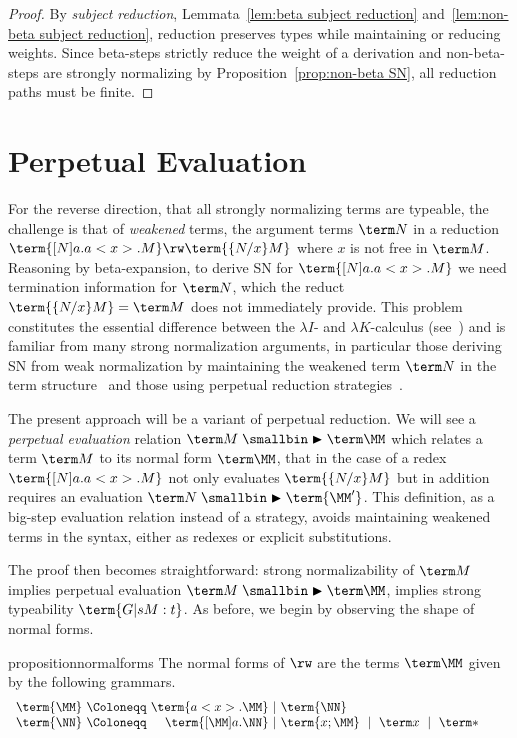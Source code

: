 \documentclass[10pt,a4paper]{amsart}
\newcommand\rp{\mathrel{\smallbin\blacktriangleright}}
\begin{document}
\begin{proof}
By \emph{subject reduction}, Lemmata~\ref{lem:beta subject reduction} and~\ref{lem:non-beta subject reduction}, reduction preserves types while maintaining or reducing weights. Since beta-steps strictly reduce the weight of a derivation and non-beta-steps are strongly normalizing by Proposition~\ref{prop:non-beta SN}, all reduction paths must be finite.
\end{proof}


\section{Perpetual Evaluation}
\label{sec:perp}

For the reverse direction, that all strongly normalizing terms are typeable, the challenge is that of \emph{weakened} terms, the argument terms $\term N$ in a reduction $\term{[N]a.a<x>.M}\rw\term{\{N/x\}M}$ where $x$ is not free in $\term M$. Reasoning by beta-expansion, to derive SN for $\term{[N]a.a<x>.M}$ we need termination information for $\term N$, which the reduct $\term{\{N/x\}M}=\term M$ does not immediately provide. This problem constitutes the essential difference between the $\lambda I$- and $\lambda K$-calculus (see~\cite{Barendregt-1984}) and is familiar from many strong normalization arguments, in particular those deriving SN from weak normalization by maintaining the weakened term $\term N$ in the term structure~\cite{Klop-1980,Nederpelt-1973} and those using perpetual reduction strategies~\cite{Bergstra-Klop-1982,Raamsdonk-Severi-Sorensen-Xi-1999}.

The present approach will be a variant of perpetual reduction. We will see a \emph{perpetual evaluation} relation $\term M\rp\term\MM$ which relates a term $\term M$ to its normal form $\term\MM$, that in the case of a redex $\term{[N]a.a<x>.M}$ not only evaluates $\term{\{N/x\}M}$ but in addition requires an evaluation $\term N\rp\term{\MM'}$. This definition, as a big-step evaluation relation instead of a strategy, avoids maintaining weakened terms in the syntax, either as redexes or explicit substitutions.

The proof then becomes straightforward: strong normalizability of $\term M$ implies perpetual evaluation $\term M\rp\term\MM$, implies strong typeability $\term{G |s M:t}$. As before, we begin by observing the shape of normal forms.

\begin{restatable}{proposition}{normalforms}
The normal forms of $\rw$ are the terms $\term\MM$ given by the following grammars.
\[
\begin{array}{l@{~}l@{~}r@{~}l@{~}l}
	\term{\MM} &\Coloneqq&   \term{a<x>.\MM} &\mid& \term{\NN}
\\	\term{\NN} &\Coloneqq& \term{[\MM]a.\NN} &\mid& \term{x;\MM} ~\mid~ \term x ~\mid~ \term*
\end{array}
\qquad
\]
\end{restatable}
\end{document}
